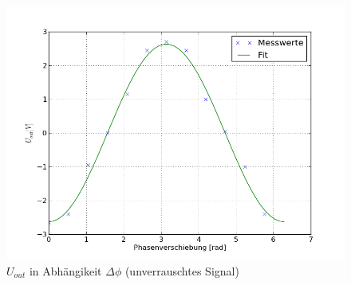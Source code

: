 \documentclass[11pt]{article}
\begin{document}
\begin{figure}[h]
\centering
\includegraphics[scale=0.50]{Diagramme/diag1.png}
\caption{$U_{out}$ in Abhängikeit $\Delta \phi$ (unverrauschtes Signal)}
\label{sinediag}
\end{figure}
\end{document}
